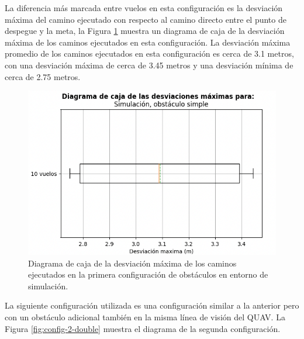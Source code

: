 La diferencia más marcada entre vuelos en esta configuración es la desviación máxima del camino ejecutado con respecto al camino directo entre el punto de despegue y la meta, la Figura \ref{fig:single-max-deviation} muestra un diagrama de caja de la desviación máxima de los caminos ejecutados en esta configuración. La desviación máxima promedio de los caminos ejecutados en esta configuración es cerca de 3.1 metros, con una desviación máxima de cerca de 3.45 metros y una desviación mínima de cerca de 2.75 metros.

\begin{figure}[H]
    \centering
    \includegraphics[scale=0.55]{partes/img/sim-single-panel-box.png}
    \caption[Diagrama de caja de la desviación máxima de los caminos ejecutados en la primera configuración de obstáculos en entorno de simulación.]{Diagrama de caja de la desviación máxima de los caminos ejecutados en la primera configuración de obstáculos en entorno de simulación.}
    \label{fig:single-max-deviation}
\end{figure}

La siguiente configuración utilizada es una configuración similar a la anterior pero con un obstáculo adicional también en la misma línea de visión del QUAV. La Figura \ref{fig:config-2-double} muestra el diagrama de la segunda configuración.

